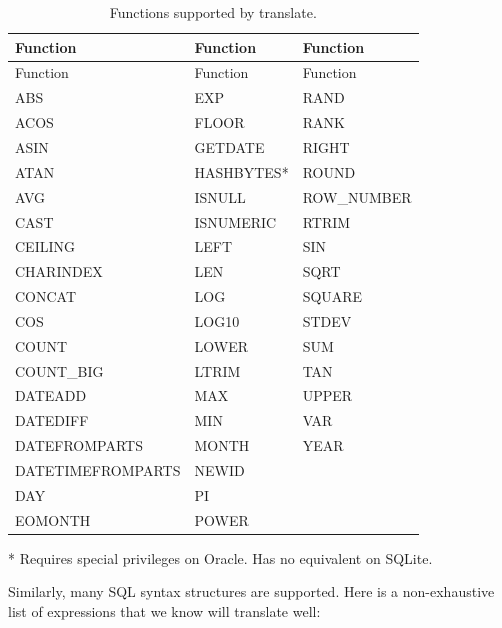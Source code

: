 \documentclass[11pt]{book}
\theoremstyle{definition}
\theoremstyle{definition}
\theoremstyle{definition}
\theoremstyle{remark}
\begin{document}
\begin{longtable}[]{@{}lll@{}}
\caption{\label{tab:sqlFunctions} Functions supported by translate.}\tabularnewline
\toprule
Function & Function & Function\tabularnewline
\midrule
\endfirsthead
\toprule
Function & Function & Function\tabularnewline
\midrule
\endhead
ABS & EXP & RAND\tabularnewline
ACOS & FLOOR & RANK\tabularnewline
ASIN & GETDATE & RIGHT\tabularnewline
ATAN & HASHBYTES* & ROUND\tabularnewline
AVG & ISNULL & ROW\_NUMBER\tabularnewline
CAST & ISNUMERIC & RTRIM\tabularnewline
CEILING & LEFT & SIN\tabularnewline
CHARINDEX & LEN & SQRT\tabularnewline
CONCAT & LOG & SQUARE\tabularnewline
COS & LOG10 & STDEV\tabularnewline
COUNT & LOWER & SUM\tabularnewline
COUNT\_BIG & LTRIM & TAN\tabularnewline
DATEADD & MAX & UPPER\tabularnewline
DATEDIFF & MIN & VAR\tabularnewline
DATEFROMPARTS & MONTH & YEAR\tabularnewline
DATETIMEFROMPARTS & NEWID &\tabularnewline
DAY & PI &\tabularnewline
EOMONTH & POWER &\tabularnewline
\bottomrule
\end{longtable}

* Requires special privileges on Oracle. Has no equivalent on SQLite.

Similarly, many SQL syntax structures are supported. Here is a non-exhaustive list of expressions that we know will translate well:
\end{document}
